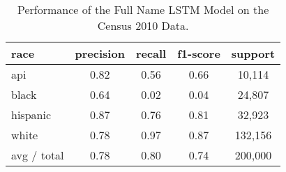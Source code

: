 \documentclass[12pt, letterpaper]{article}
\begin{document}
\begin{table}[h!]
\centering
\caption{Performance of the Full Name LSTM Model on the Census 2010 Data.}
\begin{tabular}{ l c c c c }
\hline    
   race & precision & recall & f1-score & support\\
\hline
        api &      0.82  &    0.56     & 0.66 &    10,114\\
      black &      0.64  &    0.02    &  0.04  &   24,807\\
   hispanic &      0.87  &    0.76   &   0.81  &   32,923\\
      white &      0.78  &   0.97   &   0.87   & 132,156\\

avg / total &      0.78   &   0.80 &     0.74   & 200,000\\
\hline
\end{tabular}
\label{table:last_name_census_2010}
\end{table}
\end{document}
